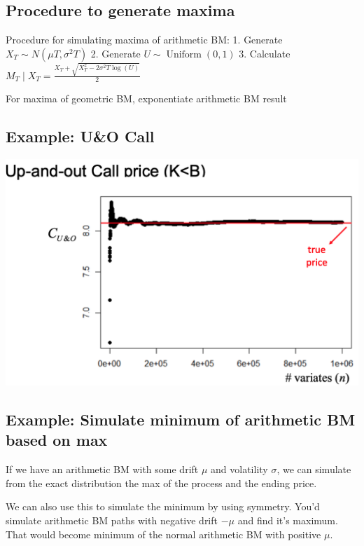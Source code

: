 \documentclass[
  oneside]{book}
\begin{document}
\hypertarget{procedure-to-generate-maxima}{%
\subsection{Procedure to generate maxima}\label{procedure-to-generate-maxima}}

Procedure for simulating maxima of arithmetic BM:
1. Generate \(X_T \sim N\left(\mu T, \sigma^2 T\right)\)
2. Generate \(U \sim \operatorname{Uniform}(0,1)\)
3. Calculate \(M_T \mid X_T=\frac{X_T+\sqrt{X_T^2-2 \sigma^2 T \log (U)}}{2}\)

For maxima of geometric BM, exponentiate arithmetic BM result

\hypertarget{example-uo-call}{%
\subsection{Example: U\&O Call}\label{example-uo-call}}

\includegraphics{Notes/Obsidian-Attachments/11-Pricing-Derivatives-4.png}

\hypertarget{example-simulate-minimum-of-arithmetic-bm-based-on-max}{%
\subsection{Example: Simulate minimum of arithmetic BM based on max}\label{example-simulate-minimum-of-arithmetic-bm-based-on-max}}

If we have an arithmetic BM with some drift \(\mu\) and volatility \(\sigma\), we can simulate from the exact distribution the max of the process and the ending price.

We can also use this to simulate the minimum by using symmetry. You'd simulate arithmetic BM paths with negative drift \(-\mu\) and find it's maximum. That would become minimum of the normal arithmetic BM with positive \(\mu\).
\end{document}

